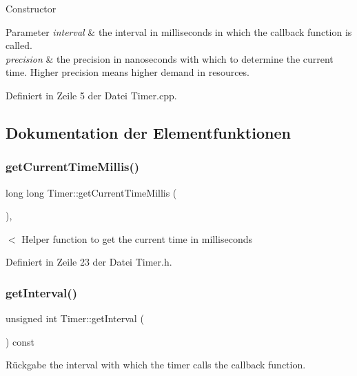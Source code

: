 Constructor 
\begin{DoxyParams}{Parameter}
{\em interval} & the interval in milliseconds in which the callback function is called. \\
\hline
{\em precision} & the precision in nanoseconds with which to determine the current time. Higher precision means higher demand in resources. \\
\hline
\end{DoxyParams}


Definiert in Zeile 5 der Datei Timer.\+cpp.



\subsection{Dokumentation der Elementfunktionen}
\mbox{\label{class_timer_a39a332f8ce3a45ed8d78c772755342c8}} 
\subsubsection{\texorpdfstring{get\+Current\+Time\+Millis()}{getCurrentTimeMillis()}}
{\footnotesize\ttfamily long long Timer\+::get\+Current\+Time\+Millis (\begin{DoxyParamCaption}{ }\end{DoxyParamCaption})\hspace{0.3cm}{\ttfamily [inline]}, {\ttfamily [private]}}

$<$ Helper function to get the current time in milliseconds 

Definiert in Zeile 23 der Datei Timer.\+h.

\mbox{\label{class_timer_a6cbb88b5073d95fd871a012966005618}} 
\subsubsection{\texorpdfstring{get\+Interval()}{getInterval()}}
{\footnotesize\ttfamily unsigned int Timer\+::get\+Interval (\begin{DoxyParamCaption}{ }\end{DoxyParamCaption}) const}

\begin{DoxyReturn}{Rückgabe}
the interval with which the timer calls the callback function. 
\end{DoxyReturn}


